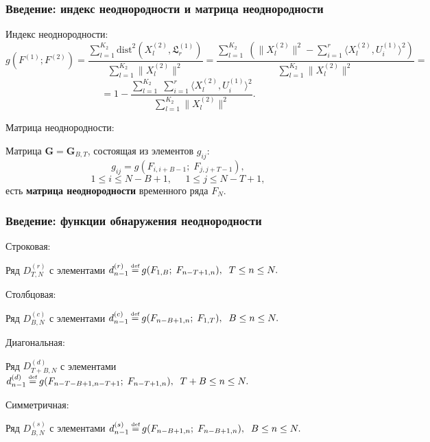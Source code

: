 \documentclass[pdf, 9pt,intlimits, unicode]{beamer}
\newcommand\eqdef{\mathrel{\stackrel{\makebox[0pt]{\mbox{\normalfont\tiny def}}}{=}}}
\begin{document}
	\begin{frame}
		\frametitle{Введение: индекс неоднородности и матрица неоднородности}	
		{\color{blue} Индекс неоднородности:} 
		$$ g(F^{(1)}; F^{(2)}) = \frac{\sum\limits_{l=1}^{K_2}\mathrm{dist}^2(X_l^{(2)}, \mathfrak{L}_r^{(1)})}{\sum\limits_{l=1}^{K_2}\|X_l^{(2)}\|^2} = \frac{\sum\limits_{l=1}^{K_2}\;(\|X_l^{(2)}\|^2 - \sum\limits_{i=1}^{r}\langle X_l^{(2)}, U_i^{(1)}\rangle^2)}{\sum\limits_{l=1}^{K_2}\|X_l^{(2)}\|^2} = $$
		$$ = 1 - \frac{\sum\limits_{l=1}^{K_2}\;\sum\limits_{i=1}^{r}\langle X_l^{(2)}, U_i^{(1)}\rangle^2}{\sum\limits_{l=1}^{K_2}\|X_l^{(2)}\|^2}. $$
		
		{\color{blue} Матрица неоднородности:}
		
		Матрица $ \mathbf{G} = \mathbf{G}_{B, T} $, состоящая из элементов $g_{ij}$:
		$$g_{ij} = g(F_{i, i+B-1};\;F_{j, j+T-1}), $$ 
		$$1 \leq i \leq N-B+1,\;\;\;\;\; 1 \leq j \leq N-T+1,$$
		есть \textbf{матрица неоднородности} временного ряда $ F_N $.
		
	\end{frame}
	
	\begin{frame}
		\frametitle{Введение: функции обнаружения неоднородности}	
		{\color{blue} Строковая:}
		
		Ряд $ D_{T,N}^{(r)} $ с элементами $ d_{n-1}^{(r)} \eqdef g(F_{1, B};\; F_{n-T+1, n}), \;\; T \leq n \leq N. $
		
		\bigskip
		{\color{blue} Столбцовая:}
		
		Ряд $ D_{B,N}^{(c)} $ с элементами $ d_{n-1}^{(c)} \eqdef g(F_{n-B+1, n};\; F_{1, T}), \;\; B \leq n \leq N. $
		
		\bigskip
		{\color{blue} Диагональная:}
		
		Ряд $ D_{T+B,N}^{(d)} $ с элементами $ d_{n-1}^{(d)} \eqdef g(F_{n-T-B+1, n-T+1};\; F_{n-T+1, n}), \;\; T + B \leq n \leq N. $
		
		\bigskip
		{\color{blue} Симметричная:}
		
		Ряд $ D_{B,N}^{(s)} $ с элементами $ d_{n-1}^{(s)} \eqdef g(F_{n-B+1, n};\; F_{n-B+1, n}), \;\; B \leq n \leq N. $
		
	\end{frame}
\end{document}

